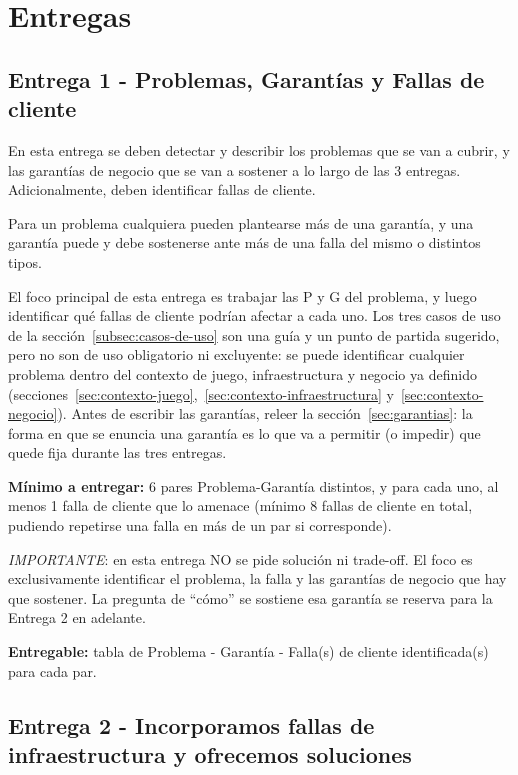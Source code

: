 \documentclass[variant=guia,cover=institutional,mode=screen]{ua-engineering-v6-article}
\begin{document}
    \section{Entregas}\label{sec:entregas}

    \subsection{Entrega 1 - Problemas, Garantías y Fallas de cliente}\label{subsec:entrega-1}

    En esta entrega se deben detectar y describir los problemas que se van a cubrir, y las garantías de negocio que se van a sostener a lo largo de las 3 entregas.
    Adicionalmente, deben identificar fallas de cliente.

    Para un problema cualquiera pueden plantearse más de una garantía, y una garantía puede y debe sostenerse ante más de una falla del mismo o distintos tipos.

    El foco principal de esta entrega es trabajar las P y G del problema, y luego identificar qué fallas de cliente podrían afectar a cada uno.
    Los tres casos de uso de la sección~\ref{subsec:casos-de-uso} son una guía y un punto de partida sugerido, pero no son de uso obligatorio ni excluyente: se puede identificar cualquier problema dentro del contexto de juego, infraestructura y negocio ya definido (secciones~\ref{sec:contexto-juego},~\ref{sec:contexto-infraestructura} y~\ref{sec:contexto-negocio}).
    Antes de escribir las garantías, releer la sección~\ref{sec:garantias}: la forma en que se enuncia una garantía es lo que va a permitir (o impedir) que quede fija durante las tres entregas.

    \textbf{Mínimo a entregar:} 6 pares Problema-Garantía distintos, y para cada uno, al menos 1 falla de cliente que lo amenace (mínimo 8 fallas de cliente en total, pudiendo repetirse una falla en más de un par si corresponde).

    \emph{IMPORTANTE}: en esta entrega NO se pide solución ni trade-off.
    El foco es exclusivamente identificar el problema, la falla y las garantías de negocio que hay que sostener.
    La pregunta de ``cómo'' se sostiene esa garantía se reserva para la Entrega 2 en adelante.

    \textbf{Entregable:} tabla de Problema - Garantía - Falla(s) de cliente identificada(s) para cada par.

    \subsection{Entrega 2 - Incorporamos fallas de infraestructura y ofrecemos soluciones}\label{subsec:entrega-2}
\end{document}
